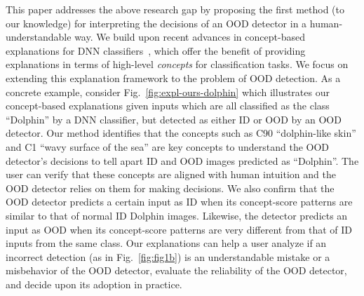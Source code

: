 This paper addresses the above research gap by proposing the first method (to our knowledge) for interpreting the decisions of an OOD detector in a human-understandable way.
We build upon recent advances in concept-based explanations for DNN classifiers~\citep{ghorbani2019ace,zhou2018interpretable,bouchacourt2019educe,yeh2020completeness}, which offer the benefit of providing explanations in terms of high-level {\em concepts} for classification tasks.
We focus on extending this explanation framework to the problem of OOD detection.
As a concrete example, consider Fig.~\ref{fig:expl-ours-dolphin} which illustrates our concept-based explanations given inputs which are all classified as the class ``Dolphin'' by a DNN classifier, but detected as either ID or OOD by an OOD detector.
Our method identifies that the concepts such as C90 ``dolphin-like skin'' and C1 ``wavy surface of the sea'' are key concepts to understand the OOD detector's decisions to tell apart ID and OOD images predicted as ``Dolphin''.
The user can verify that these concepts are aligned with human intuition and the OOD detector relies on them for making decisions.
We also confirm that the OOD detector predicts a certain input as ID when its concept-score patterns are similar to that of normal ID Dolphin images. Likewise, the detector predicts an input as OOD when its concept-score patterns are very different from that of ID inputs from the same class.
Our explanations can help a user analyze if an incorrect detection (as in Fig.~\ref{fig:fig1b}) is an understandable mistake or a misbehavior of the OOD detector, evaluate the reliability of the OOD detector, and decide upon its adoption in practice.




